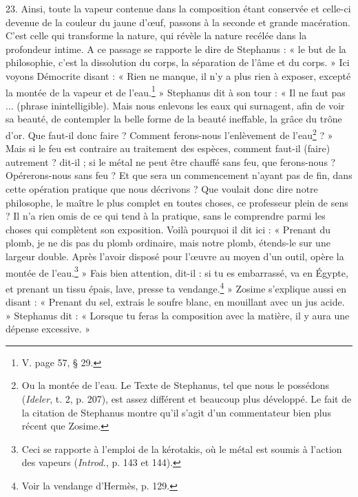 \documentclass[landscape, a4paper, 11pt, oneside, polutonikogreek, french]{article}
\begin{document}
23. Ainsi, toute la vapeur contenue dans la composition étant conservée et celle-ci devenue de la couleur du jaune d'œuf, passons à la seconde et grande macération. C'est celle qui transforme la nature, qui révèle la nature recélée dans la profondeur intime. A ce passage se rapporte le dire de Stephanus : « le but de la philosophie, c'est la dissolution du corps, la séparation de l'âme et du corps. » Ici voyons Démocrite disant : « Rien ne manque, il n'y a plus rien à exposer, excepté la montée de la vapeur et de l'eau.\footnote{V. page 57, § 29.} » Stephanus dit à son tour : « Il ne faut pas ... (phrase inintelligible). Mais nous enlevons les eaux qui surnagent, afin de voir sa beauté, de contempler la belle forme de la beauté ineffable, la grâce du trône d'or. Que faut-il donc faire ? Comment ferons-nous l'enlèvement de l'eau\footnote{Ou la montée de l'eau. Le Texte de Stephanus, tel que nous le possédons (\emph{Ideler}, t. 2, p. 207), est assez différent et beaucoup plus développé. Le fait de la citation de Stephanus montre qu'il s'agit d'un commentateur bien plus récent que Zosime.} ? » Mais si le feu est contraire au traitement des espèces, comment faut-il (faire) autrement ? dit-il ; si le métal ne peut être chauffé sans feu, que ferons-nous ? Opérerons-nous sans feu ? Et que sera un commencement n'ayant pas de fin, dans cette opération pratique que nous décrivons ? Que voulait donc dire notre philosophe, le maître le plus complet en toutes choses, ce professeur plein de sens ? Il n'a rien omis de ce qui tend à la pratique, sans le comprendre parmi les choses qui complètent son exposition. Voilà pourquoi il dit ici : « Prenant du plomb, je ne dis pas du plomb ordinaire, mais notre plomb, étends-le sur une largeur double. Après l'avoir disposé pour l'œuvre au moyen d'un outil, opère la montée de l'eau.\footnote{Ceci se rapporte à l'emploi de la kérotakis, où le métal est soumis à l'action des vapeurs (\emph{Introd.}, p. 143 et 144).} » Fais bien attention, dit-il : si tu es embarrassé, va en Égypte, et prenant un tissu épais, lave, presse ta vendange.\footnote{Voir la vendange d'Hermès, p. 129.} » Zosime s'explique aussi en disant : « Prenant du sel, extrais le soufre blanc, en mouillant avec un jus acide. » Stephanus dit : « Lorsque tu feras la composition avec la matière, il y aura une dépense excessive. »
\end{document}
